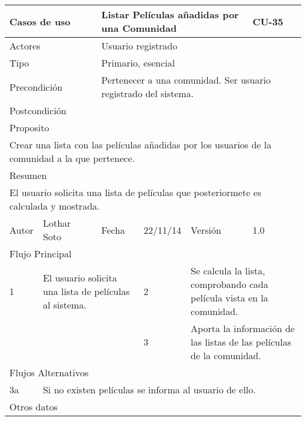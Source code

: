 \documentclass{article}
\begin{document}
\begin{table}[h]
\begin{tabular}{|l|l|l|l|l|l|}
\hline
\multicolumn{2}{|p{2cm}|}{Casos de uso}  & \multicolumn{3}{p{7cm}|}{Listar Películas añadidas por una Comunidad} & CU-35 \\
\hline
\multicolumn{2}{|p{2cm}|}{Actores}       & \multicolumn{4}{p{8cm}|}{Usuario registrado}        \\
\hline
\multicolumn{2}{|p{2cm}|}{Tipo}          & \multicolumn{4}{p{8cm}|}{Primario, esencial}        \\
\hline
\multicolumn{2}{|p{2cm}|}{Precondición}  & \multicolumn{4}{p{8cm}|}{Pertenecer a una comunidad. Ser usuario registrado del sistema.}        \\
\hline
\multicolumn{2}{|p{2cm}|}{Postcondición} & \multicolumn{4}{p{8cm}|}{}        \\
\hline
\multicolumn{6}{|p{10cm}|}{Proposito}                                   \\
\hline
\multicolumn{6}{|p{10cm}|}{Crear una lista con las películas añadidas por los usuarios de la comunidad a la que pertenece.}                                            \\
\hline
\multicolumn{6}{|p{10cm}|}{Resumen}                                 \\
\hline
\multicolumn{6}{|p{10cm}|}{El usuario solicita una lista de películas que posteriormete es calculada y mostrada.}                                            \\
\hline
Autor         &       Lothar Soto        &  Fecha   &  22/11/14   &   Versión  & 1.0\\
\hline
\multicolumn{6}{|p{10cm}|}{Flujo Principal}\\
\hline
\multicolumn{1}{|p{1cm}|}{1} & \multicolumn{2}{p{3cm}}{El usuario solicita una lista de películas al sistema.} & \multicolumn{1}{|p{1cm}|}{2} & \multicolumn{2}{p{3cm}|}{Se calcula la lista, comprobando cada película vista en la comunidad.}\\
\hline
\multicolumn{1}{|p{1cm}|}{} & \multicolumn{2}{p{3cm}}{} & \multicolumn{1}{|p{1cm}|}{3} & \multicolumn{2}{p{3cm}|}{Aporta la información de las listas de las películas de la comunidad.}\\
\hline
\multicolumn{6}{|p{10cm}|}{Flujos Alternativos}\\
\hline
\multicolumn{1}{|p{1cm}}{3a} & \multicolumn{5}{|p{9cm}|}{Si no existen películas se informa al usuario de ello.}\\
\hline
\multicolumn{6}{|p{10cm}|}{Otros datos}\\

\end{tabular}
\end{table}
\end{document}
